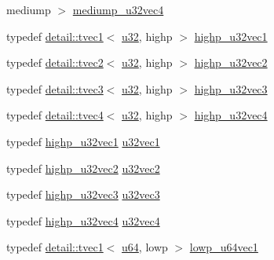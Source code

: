 \begin{DoxyCompactItemize}
mediump $>$ \hyperlink{group__gtc__type__precision_ga532f59ac4c36a7e1371341165f7be33b}{mediump\-\_\-u32vec4}
\item 
typedef \hyperlink{structglm_1_1detail_1_1tvec1}{detail\-::tvec1}$<$ \hyperlink{group__gtc__type__precision_ga54e837745059fd29017bed71cfa0a8db}{u32}, highp $>$ \hyperlink{group__gtc__type__precision_ga8a92d1f79e2fd4a03be803e35aac8e1b}{highp\-\_\-u32vec1}
\item 
typedef \hyperlink{structglm_1_1detail_1_1tvec2}{detail\-::tvec2}$<$ \hyperlink{group__gtc__type__precision_ga54e837745059fd29017bed71cfa0a8db}{u32}, highp $>$ \hyperlink{group__gtc__type__precision_gaddb81e8e12bd640e188744ed372c95bb}{highp\-\_\-u32vec2}
\item 
typedef \hyperlink{structglm_1_1detail_1_1tvec3}{detail\-::tvec3}$<$ \hyperlink{group__gtc__type__precision_ga54e837745059fd29017bed71cfa0a8db}{u32}, highp $>$ \hyperlink{group__gtc__type__precision_gab1e386f5e415e00f800edf5d15207286}{highp\-\_\-u32vec3}
\item 
typedef \hyperlink{structglm_1_1detail_1_1tvec4}{detail\-::tvec4}$<$ \hyperlink{group__gtc__type__precision_ga54e837745059fd29017bed71cfa0a8db}{u32}, highp $>$ \hyperlink{group__gtc__type__precision_ga9418a8d549d344d4f7b7158771a2fdfe}{highp\-\_\-u32vec4}
\item 
typedef \hyperlink{group__gtc__type__precision_ga8a92d1f79e2fd4a03be803e35aac8e1b}{highp\-\_\-u32vec1} \hyperlink{group__gtc__type__precision_gac8263c8c0bb36bc5c3d109f508e0fb41}{u32vec1}
\item 
typedef \hyperlink{group__gtc__type__precision_gaddb81e8e12bd640e188744ed372c95bb}{highp\-\_\-u32vec2} \hyperlink{group__gtc__type__precision_gaa543e17450ca67dee12e2c41badfb3a7}{u32vec2}
\item 
typedef \hyperlink{group__gtc__type__precision_gab1e386f5e415e00f800edf5d15207286}{highp\-\_\-u32vec3} \hyperlink{group__gtc__type__precision_ga7c88634a005904a441cba739d7cc4055}{u32vec3}
\item 
typedef \hyperlink{group__gtc__type__precision_ga9418a8d549d344d4f7b7158771a2fdfe}{highp\-\_\-u32vec4} \hyperlink{group__gtc__type__precision_ga7e4574f8327a2f576baf2617343d0170}{u32vec4}
\item 
typedef \hyperlink{structglm_1_1detail_1_1tvec1}{detail\-::tvec1}$<$ \hyperlink{group__gtc__type__precision_ga71cedd4972f9cb1a5e14dfe5ab83ecd7}{u64}, lowp $>$ \hyperlink{group__gtc__type__precision_gacd97dc5e92d0e2f6f6d62a5160508e2a}{lowp\-\_\-u64vec1}
\item 

\end{DoxyCompactItemize}

